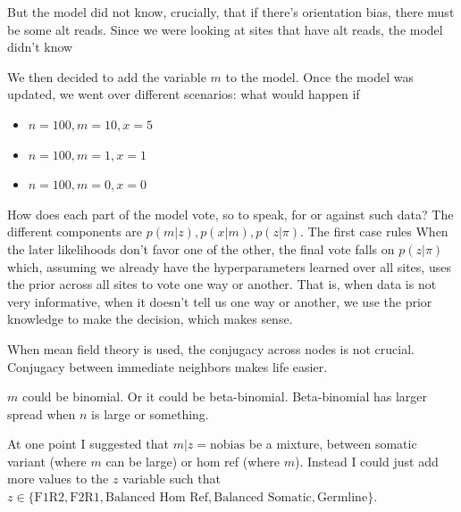 \documentclass[a4paper]{article}
\begin{document}
But the model did not know, crucially, that if there's orientation bias, there must be some alt reads. Since we were looking at sites that have alt reads, the model didn't know 

We then decided to add the variable $m$ to the model.  Once the model was updated, we went over different scenarios: what would happen if 
\begin{itemize}
\item $n = 100, m = 10, x = 5$ 
\item $n = 100, m = 1, x = 1$
\item $n = 100, m = 0, x = 0$
\end{itemize}

How does each part of the model vote, so to speak, for or against such data? The different components are $p(m|z), p(x|m), p(z | \pi)$. The first case rules 
When the later likelihoods don't favor one of the other, the final vote falls on $p(z | \pi)$ which, assuming we already have the hyperparameters learned over all sites, uses the prior across all sites to vote one way or another. That is, when data is not very informative, when it doesn't tell us one way or another, we use the prior knowledge to make the decision, which makes sense.

When mean field theory is used, the conjugacy across nodes is not crucial. Conjugacy between immediate neighbors makes life easier.

$m$ could be binomial. Or it could be beta-binomial. Beta-binomial has larger spread when $n$ is large or something. 

At one point I suggested that $m|z = \mathrm{no bias}$ be a mixture, between somatic variant (where $m$ can be large) or hom ref (where $m$). Instead I could just add more values to the $z$ variable such that $z \in \{ \text{F1R2}, \text{F2R1}, \text{Balanced Hom Ref}, \text{Balanced Somatic}, \text{Germline} \}$.
\end{document}
